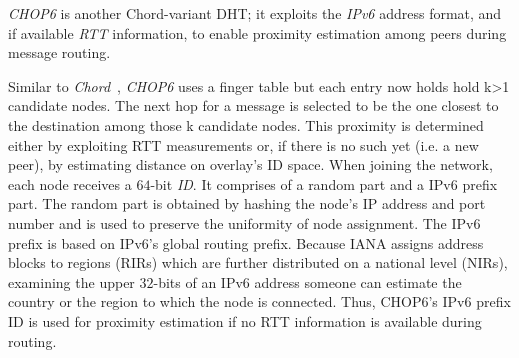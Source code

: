 \emph{CHOP6} \cite{MT2007} is another Chord-variant DHT; it exploits
the {\sl IPv6} address format, and if available \emph{RTT} information, to 
enable proximity estimation among peers during message routing.

Similar to \emph{Chord}~\cite{stoica_chord_2001}, 
\emph{CHOP6} uses a finger table but each entry now holds hold k>1 candidate
nodes. The next hop for a message is selected to be the one closest to the
destination among those k candidate nodes. This proximity is determined either
by exploiting RTT measurements or, if there is no such yet (i.e. a new peer), by
estimating distance on overlay's ID space. When joining the network, each node
receives a $64$-bit \emph{ID}. It comprises of a random part and a IPv6 prefix
part. The random part is obtained by hashing the node's IP address and port
number and is used to preserve the uniformity of
node assignment. The IPv6 prefix is based on IPv6's global routing prefix.
Because IANA  assigns address blocks to regions (RIRs) which are further
distributed on a national level (NIRs), examining the upper $32$-bits
of an IPv6 address someone can estimate the country or the region to which the
node is connected. Thus, CHOP6's IPv6 prefix ID is used for proximity estimation
if no RTT information is available during routing. 

